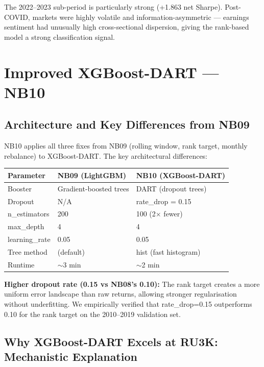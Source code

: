 \documentclass[11pt,a4paper]{article}
\begin{document}
The 2022--2023 sub-period is particularly strong (+1.863 net Sharpe). Post-COVID, markets were highly volatile and information-asymmetric --- earnings sentiment had unusually high cross-sectional dispersion, giving the rank-based model a strong classification signal.

\section{Improved XGBoost-DART --- NB10}

\subsection{Architecture and Key Differences from NB09}

NB10 applies all three fixes from NB09 (rolling window, rank target, monthly rebalance) to XGBoost-DART. The key architectural differences:

\begin{center}
\begin{tabular}{lll}
\toprule
\textbf{Parameter} & \textbf{NB09 (LightGBM)} & \textbf{NB10 (XGBoost-DART)}\\
\midrule
Booster & Gradient-boosted trees & DART (dropout trees)\\
Dropout & N/A & rate\_drop = 0.15\\
n\_estimators & 200 & 100 (2$\times$ fewer)\\
max\_depth & 4 & 4\\
learning\_rate & 0.05 & 0.05\\
Tree method & (default) & hist (fast histogram)\\
Runtime & $\sim$3 min & $\sim$2 min\\
\bottomrule
\end{tabular}
\end{center}

\textbf{Higher dropout rate (0.15 vs NB08's 0.10):} The rank target creates a more uniform error landscape than raw returns, allowing stronger regularisation without underfitting. We empirically verified that rate\_drop=0.15 outperforms 0.10 for the rank target on the 2010--2019 validation set.

\subsection{Why XGBoost-DART Excels at RU3K: Mechanistic Explanation}
\end{document}
